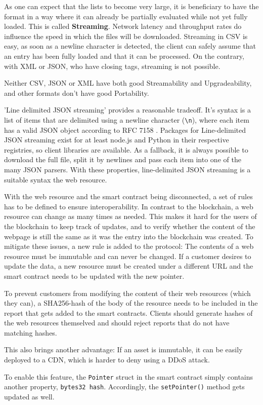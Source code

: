 As one can expect that the lists to become very large, it is beneficiary to have the format in a way where it can already be partially evaluated while not yet fully loaded. This is called \textbf{Streaming}. Network latency and throughput rates do influence the speed in which the files will be downloaded.
Streaming in CSV is easy, as soon as a newline character is detected, the client can safely assume that an entry has been fully loaded and that it can be processed. On the contrary, with XML or JSON, who have closing tags, streaming is not possible.

Neither CSV, JSON or XML have both good Streamability and Upgradeability, and other formats don't have good Portability.

'Line delimited JSON streaming' \cite{LineDelimitedJSON} provides a reasonable tradeoff. It's syntax is a list of items that are delimited using a newline character (\texttt{{\textbackslash}n}), where each item has a valid JSON object according to RFC 7158 \cite{RFC7158}. Packages for Line-delimited JSON streaming exist for at least node.js and Python in their respective registries, so client libraries are available. As a fallback, it is always possible to download the full file, split it by newlines and pass each item into one of the many JSON parsers.
With these properties, line-delimited JSON streaming is a suitable syntax the web resource.

With the web resource and the smart contract being disconnected, a set of rules has to be defined to ensure interoperability. In contrast to the blockchain, a web resource can change as many times as needed. This makes it hard for the users of the blockchain to keep track of updates, and to verify whether the content of the webpage is still the same as it was the entry into the blockchain was created. To mitigate these issues, a new rule is added to the protocol: The contents of a web resource must be immutable and can never be changed. If a customer desires to update the data, a new resource must be created under a different URL and the smart contract needs to be updated with the new pointer.

To prevent customers from modifying the content of their web resources (which they can), a SHA256-hash of the body of the resource needs to be included in the report that gets added to the smart contracts. Clients should generate hashes of the web resources themselved and should reject reports that do not have matching hashes.

This also brings another advantage: If an asset is immutable, it can be easily deployed to a CDN, which is harder to deny using a DDoS attack.

To enable this feature, the \texttt{Pointer} struct in the smart contract simply contains another property, \texttt{bytes32 hash}. Accordingly, the \texttt{setPointer()} method gets updated as well.
